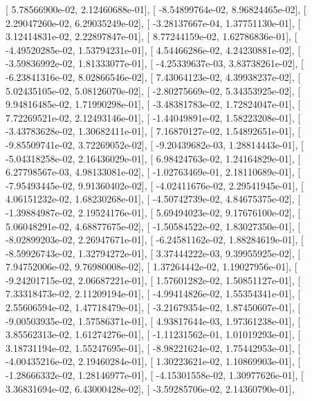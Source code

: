 \documentclass{article}
\begin{document}
       [  5.78566900e-02,   2.12460688e-01],
       [ -8.54899764e-02,   8.96824465e-02],
       [  2.29047260e-02,   6.29035249e-02],
       [ -3.28137667e-04,   1.37751130e-01],
       [  3.12414831e-02,   2.22897847e-01],
       [  8.77244159e-02,   1.62786836e-01],
       [ -4.49520285e-02,   1.53794231e-01],
       [  4.54466286e-02,   4.24230881e-02],
       [ -3.59836992e-02,   1.81333077e-01],
       [ -4.25339637e-03,   3.83738261e-02],
       [ -6.23841316e-02,   8.02866546e-02],
       [  7.43064123e-02,   4.39938237e-02],
       [  5.02435105e-02,   5.08126070e-02],
       [ -2.80275669e-02,   5.34353925e-02],
       [  9.94816485e-02,   1.71990298e-01],
       [ -3.48381783e-02,   1.72824047e-01],
       [  7.72269521e-02,   2.12493146e-01],
       [ -1.44049891e-02,   1.58223208e-01],
       [ -3.43783628e-02,   1.30682411e-01],
       [  7.16870127e-02,   1.54892651e-01],
       [ -9.85509741e-02,   3.72269052e-02],
       [ -9.20439682e-03,   1.28814443e-01],
       [ -5.04318258e-02,   2.16436029e-01],
       [  6.98424763e-02,   1.24164829e-01],
       [  6.27798567e-03,   4.98133081e-02],
       [ -1.02763469e-01,   2.18110689e-01],
       [ -7.95493445e-02,   9.91360402e-02],
       [ -4.02411676e-02,   2.29541945e-01],
       [  4.06151232e-02,   1.68230268e-01],
       [ -4.50742739e-02,   4.84675375e-02],
       [ -1.39884987e-02,   2.19524176e-01],
       [  5.69494023e-02,   9.17676100e-02],
       [  5.06048291e-02,   4.68877675e-02],
       [ -1.50584522e-02,   1.83027350e-01],
       [ -8.02899203e-02,   2.26947671e-01],
       [ -6.24581162e-02,   1.88284619e-01],
       [ -8.59926743e-02,   1.32794272e-01],
       [  3.37444222e-03,   9.39955925e-02],
       [  7.94752006e-02,   9.76980008e-02],
       [  1.37264442e-02,   1.19027956e-01],
       [ -9.24201715e-02,   2.06687221e-01],
       [  1.57601282e-02,   1.50851127e-01],
       [  7.33318473e-02,   2.11209194e-01],
       [ -4.99414826e-02,   1.55354341e-01],
       [  2.55606594e-02,   1.47718479e-01],
       [ -3.21679354e-02,   1.87450607e-01],
       [ -9.00503935e-02,   1.57586371e-01],
       [  4.93817644e-03,   1.97361238e-01],
       [  3.85562313e-02,   1.61274276e-01],
       [ -1.11231562e-01,   1.01019293e-01],
       [  3.18731194e-02,   1.55247695e-01],
       [ -8.98221624e-02,   1.75442953e-01],
       [ -4.00435216e-02,   2.19460284e-01],
       [  1.30223621e-02,   1.10869903e-01],
       [ -1.28666332e-02,   1.28146977e-01],
       [ -4.15301558e-02,   1.30977626e-01],
       [  3.36831694e-02,   6.43000428e-02],
       [ -3.59285706e-02,   2.14360790e-01],
\end{document}
